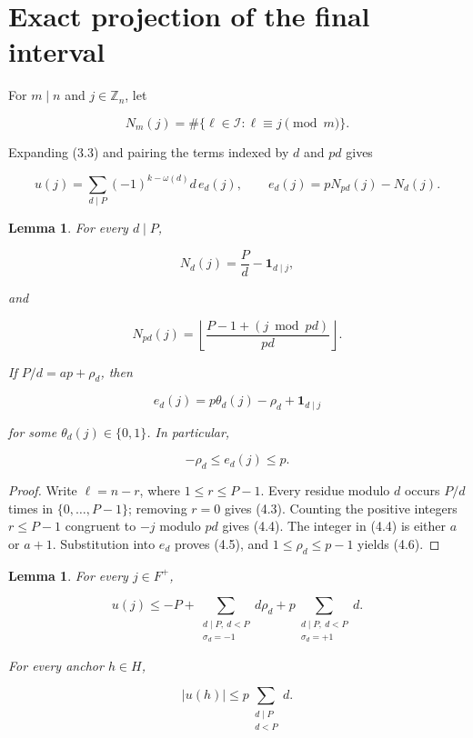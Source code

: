 \documentclass[11pt]{article}
\newtheorem{lemma}[theorem]{Lemma}
\numberwithin{equation}{section}
\begin{document}
\section{Exact projection of the final interval}


For \(m\mid n\) and \(j\in\mathbb Z_n\), let

\nopagebreak[4]
\[
N_m(j)=
\#\{\ell\in\mathcal I:\ell\equiv j\pmod m\}.
\tag{4.1}
\]

Expanding (3.3) and pairing the terms indexed by \(d\) and \(pd\) gives

\nopagebreak[4]
\[
u(j)=
\sum_{d\mid P}
(-1)^{k-\omega(d)}d\,e_d(j),
\qquad
e_d(j)=pN_{pd}(j)-N_d(j).
\tag{4.2}
\]

\Needspace{0.28\textheight}
\begin{lemma}

For every \(d\mid P\),

\nopagebreak[4]
\[
N_d(j)=\frac Pd-\mathbf1_{d\mid j},
\tag{4.3}
\]

and

\nopagebreak[4]
\[
N_{pd}(j)=
\left\lfloor
\frac{P-1+(j\bmod pd)}{pd}
\right\rfloor.
\tag{4.4}
\]

If \(P/d=ap+\rho_d\), then

\nopagebreak[4]
\[
e_d(j)=
p\theta_d(j)-\rho_d+\mathbf1_{d\mid j}
\tag{4.5}
\]

for some \(\theta_d(j)\in\{0,1\}\). In particular,

\nopagebreak[4]
\[
-\rho_d\leq e_d(j)\leq p.
\tag{4.6}
\]

\end{lemma}

\begin{proof}

Write \(\ell=n-r\), where \(1\leq r\leq P-1\). Every residue modulo
\(d\) occurs \(P/d\) times in \(\{0,\ldots,P-1\}\); removing \(r=0\)
gives (4.3). Counting the positive integers \(r\leq P-1\) congruent to
\(-j\) modulo \(pd\) gives (4.4). The integer in (4.4) is either \(a\)
or \(a+1\). Substitution into \(e_d\) proves (4.5), and
\(1\leq\rho_d\leq p-1\) yields (4.6).
\end{proof}


\Needspace{0.28\textheight}
\begin{lemma}

For every \(j\in F^+\),

\nopagebreak[4]
\[
u(j)\leq
-P+
\sum_{\substack{d\mid P,\ d<P\\ \sigma_d=-1}}d\rho_d
+p\sum_{\substack{d\mid P,\ d<P\\ \sigma_d=+1}}d.
\tag{4.7}
\]

For every anchor \(h\in H\),

\nopagebreak[4]
\[
|u(h)|\leq
p\sum_{\substack{d\mid P\\d<P}}d.
\tag{4.8}
\]

\end{lemma}
\end{document}
